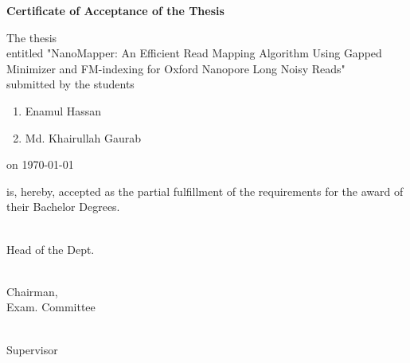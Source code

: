 \documentclass{standalone}
\begin{document}
\begin{titlepage}
				\newpage
				\begin{center}
					\textbf{\huge Certificate of Acceptance of the Thesis}
				\end{center}
				
				\noindent
				The thesis
				\\
				entitled "{NanoMapper: An Efficient Read Mapping Algorithm Using Gapped Minimizer and FM-indexing for Oxford Nanopore Long Noisy Reads}"
				\\
				submitted by the students
				\begin{enumerate}
					\item Enamul Hassan
					\item Md. Khairullah Gaurab
				\end{enumerate}
				on \today
				
				\noindent
				is, hereby, accepted as the partial fulfillment of the requirements for the award of their Bachelor Degrees.
				\vspace{2.0cm}
				
				\begin{multicols}{3}
				
				\begin{flushleft}
				\hrulefill \\
					{Head of the Dept.}\\%
					
				\end{flushleft}
				
				\begin{flushleft}
				\hrulefill \\
					{\hspace{0.5mm}Chairman,\\\hspace{0.5mm}Exam. Committee}\\%
					
				\end{flushleft}
				
				\begin{flushleft}
				\hrulefill \\
					{\hspace{0.5mm}Supervisor}\\%
				\end{flushleft}
				\end{multicols}
\end{titlepage}
\end{document}
